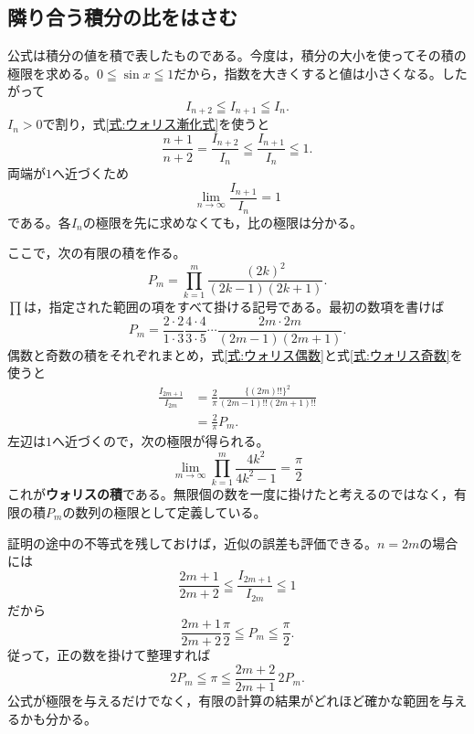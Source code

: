 \subsection{隣り合う積分の比をはさむ}

公式は積分の値を積で表したものである。今度は，積分の大小を使ってその積の極限を求める。$0\leqq\sin x\leqq1$だから，指数を大きくすると値は小さくなる。したがって
\[
 I_{n+2}\leqq I_{n+1}\leqq I_n.
\]
$I_n>0$で割り，式\eqref{式:ウォリス漸化式}を使うと
\[
 \frac{n+1}{n+2}
 =\frac{I_{n+2}}{I_n}
 \leqq\frac{I_{n+1}}{I_n}\leqq1.
\]
両端が$1$へ近づくため
\begin{equation}\label{式:ウォリス隣接比}
 \lim_{n\to\infty}\frac{I_{n+1}}{I_n}=1
\end{equation}
である。各$I_n$の極限を先に求めなくても，比の極限は分かる。

ここで，次の有限の積を作る。
\[
 P_m=\prod_{k=1}^{m}\frac{(2k)^2}{(2k-1)(2k+1)}.
\]
$\prod$は，指定された範囲の項をすべて掛ける記号である。最初の数項を書けば
\[
 P_m=\frac{2\cdot2}{1\cdot3}
      \frac{4\cdot4}{3\cdot5}\cdots
      \frac{2m\cdot2m}{(2m-1)(2m+1)}.
\]
偶数と奇数の積をそれぞれまとめ，式\eqref{式:ウォリス偶数}と式\eqref{式:ウォリス奇数}を使うと
\begin{align*}
 \frac{I_{2m+1}}{I_{2m}}
 &=\frac{2}{\pi}
   \frac{\{(2m)!!\}^2}{(2m-1)!!(2m+1)!!}\\
 &=\frac{2}{\pi}P_m.
\end{align*}
左辺は$1$へ近づくので，次の極限が得られる。
\begin{equation}\label{式:ウォリスの積}
 \boxed{\displaystyle
 \lim_{m\to\infty}\prod_{k=1}^{m}
 \frac{4k^2}{4k^2-1}=\frac{\pi}{2}}
\end{equation}
これが\textbf{ウォリスの積}である。無限個の数を一度に掛けたと考えるのではなく，有限の積$P_m$の数列の極限として定義している。

証明の途中の不等式を残しておけば，近似の誤差も評価できる。$n=2m$の場合には
\[
 \frac{2m+1}{2m+2}
 \leqq\frac{I_{2m+1}}{I_{2m}}\leqq1
\]
だから
\[
 \frac{2m+1}{2m+2}\frac{\pi}{2}
 \leqq P_m\leqq\frac{\pi}{2}.
\]
従って，正の数を掛けて整理すれば
\[
 2P_m\leqq\pi\leqq\frac{2m+2}{2m+1}\,2P_m.
\]
公式が極限を与えるだけでなく，有限の計算の結果がどれほど確かな範囲を与えるかも分かる。

